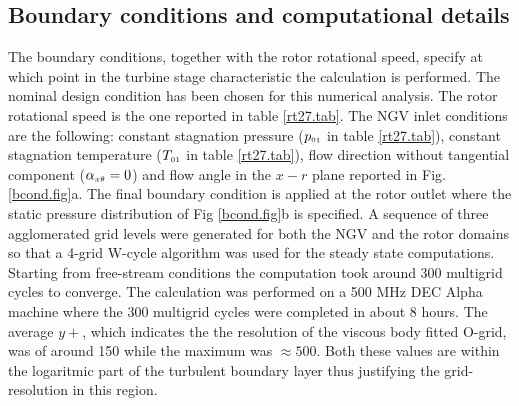 \subsection{Boundary conditions and computational details}
\label{rt27_boundary.subsec}
%
 The boundary conditions, together with the rotor rotational speed,
 specify at which point in the turbine stage characteristic the calculation
 is performed. The nominal design condition has been chosen for
 this numerical analysis. The rotor rotational speed is the one
 reported in table \ref{rt27.tab}. The NGV inlet conditions are the
 following: constant stagnation
 pressure ($p_{\mbox{\tiny $01$}}$ in table \ref{rt27.tab}), constant
 stagnation temperature ($T_{\mbox{\tiny $01$}}$ in table \ref{rt27.tab}),
 flow direction without tangential component ($\alpha_{\mbox{\tiny $x\theta$}} = 0$) and
 flow angle in the $x-r$ plane reported in Fig. \ref{bcond.fig}a.
 The final boundary condition is applied at the rotor outlet where
 the static pressure distribution of Fig \ref{bcond.fig}b is specified.
 A sequence of three agglomerated grid levels were generated for both the
 NGV and the rotor domains so that a 4-grid W-cycle algorithm was used
 for the steady state computations.
 Starting from free-stream conditions the computation took around 300
 multigrid cycles to converge. The calculation was
 performed on a 500 MHz DEC Alpha machine where the 300 multigrid cycles
 were completed in about 8 hours.
 The average $y+$, which indicates the the resolution of the viscous body fitted
 O-grid, was of around 150 while the maximum was $\approx 500$.
 Both these values are within the logaritmic part of the turbulent
 boundary layer thus justifying the grid-resolution in this region.
%
